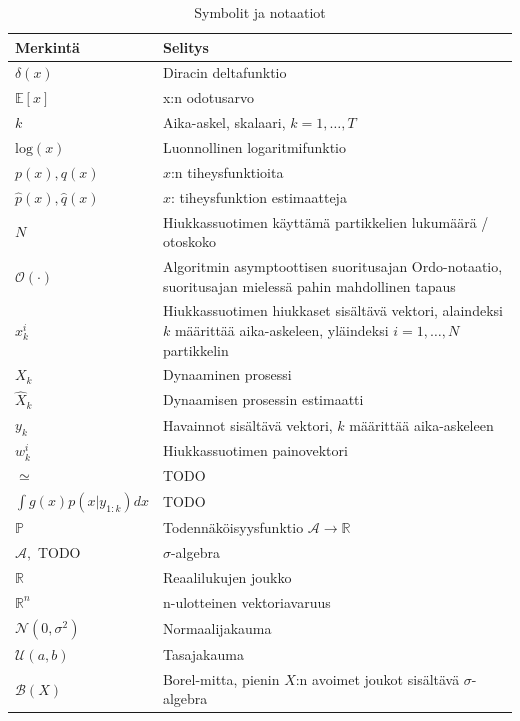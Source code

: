 \documentclass[
  12pt,
  a4paper, twoside]{book}
\begin{document}
\begin{table}

\caption{\label{tab:notaatiot}Symbolit ja notaatiot}
\centering
\begin{tabular}[t]{ll}
\toprule
Merkintä & Selitys\\
\midrule
$\delta(x)$ & Diracin deltafunktio\\
$\mathbb{E}[x]$ & x:n odotusarvo\\
$k$ & Aika-askel, skalaari, $k={1,\ldots,T}$\\
$\text{log}(x)$ & Luonnollinen logaritmifunktio\\
$p(x), q(x)$ & $x$:n tiheysfunktioita\\
\addlinespace
$\hat{p}(x), \hat{q}(x)$ & $x$: tiheysfunktion estimaatteja\\
$N$ & Hiukkassuotimen käyttämä partikkelien lukumäärä / otoskoko\\
$\mathcal{O}(\cdot)$ & \makecell[l]{Algoritmin asymptoottisen suoritusajan Ordo-notaatio,\\suoritusajan mielessä pahin mahdollinen tapaus}\\
$x^i_k$ & \makecell[l]{Hiukkassuotimen hiukkaset sisältävä vektori,\\alaindeksi $k$ määrittää aika-askeleen,\\yläindeksi $i={1,\ldots,N}$ partikkelin}\\
$X_k$ & Dynaaminen prosessi\\
\addlinespace
$\hat{X}_k$ & Dynaamisen prosessin estimaatti\\
$y_k$ & Havainnot sisältävä vektori, $k$ määrittää aika-askeleen\\
$w^i_k$ & Hiukkassuotimen painovektori\\
$\simeq$ & TODO\\
$\int g(x)p(x|y_{1:k})dx$ & TODO\\
\addlinespace
$\mathbb{P}$ & Todennäköisyysfunktio $\mathcal{A}\rightarrow\mathbb{R}$\\
$\mathcal{A},$ TODO & $\sigma$-algebra\\
$\mathbb{R}$ & Reaalilukujen joukko\\
$\mathbb{R}^n$ & n-ulotteinen vektoriavaruus\\
$\mathcal{N}(0, \sigma^2)$ & Normaalijakauma\\
\addlinespace
$\mathcal{U}(a, b)$ & Tasajakauma\\
$\mathcal{B}(X)$ & Borel-mitta, pienin $X$:n avoimet joukot sisältävä $\sigma$-algebra\\

\end{tabular}
\end{table}
\end{document}
